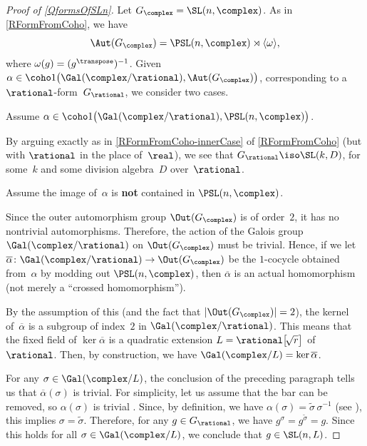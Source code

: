 \begin{proof}[Proof of \cref{QformsOfSLn}]
Let $G_\complex = \SL(n,\complex)$. As in \cref{RFormFromCoho}, we have 
	$$ \Aut (G_{\complex}) = \PSL(n,\complex) \rtimes \langle \omega \rangle ,$$
where $\omega(g) = (g^\transpose)^{-1}$. 
Given $\alpha \in \coho1\bigl( \Gal(\complex/\rational), \Aut(G_{\complex}) \bigr)$, corresponding to a $\rational$-form~$G_\rational$, we consider two cases.

\setcounter{case}{0}

\begin{case} \label{SLQforms-InnerCase}
Assume $\alpha \in \coho1\bigl( \Gal(\complex/\rational), \PSL(n,\complex) \bigr)$. 
\end{case}
By arguing exactly as in \cref{RFormFromCoho-innerCase} of \cref{RFormFromCoho} (but with $\rational$ in the place of~$\real$), we see that $G_\rational \iso \SL(k, D)$, for some~$k$ and some division algebra~$D$ over~$\rational$. 

\begin{case} \label{SLQforms-OuterCase}
Assume the image of~$\alpha$ is \textbf{not} contained in\/ $\PSL(n,\complex)$.
\end{case}
Since the outer automorphism group $\Out ( G_{\complex} )$ is of order~$2$, it has no nontrivial automorphisms. Therefore, the action of the Galois group $\Gal(\complex/\rational)$ on $\Out ( G_{\complex} )$ must be trivial. Hence, if we let $\overline\alpha \colon \Gal(\complex/\rational) \to \Out (G_{\complex} )$ be the  $1$-cocycle obtained from~$\alpha$ by modding out $\PSL(n,\complex)$, then $\overline\alpha$ is an actual homomorphism (not merely a ``crossed homomorphism''). 

By the assumption of this  (and the fact that $| {\Out(G_{\complex})} | = 2$), the kernel of~$\overline\alpha$ is a subgroup of index~$2$ in $\Gal(\complex/\rational)$. This means that the fixed field of $\ker \overline\alpha$ is a quadratic extension $L = \rational \bigl[ \!\sqrt{r}\bigr]$ of~$\rational$. Then, by construction, we have
	$ \Gal ( \complex / L ) = \ker \overline\alpha $.

For any $\sigma \in \Gal(\complex/L)$, the conclusion of the preceding paragraph tells us that $\overline\alpha(\sigma)$ is trivial. For simplicity, let us assume that the bar can be removed, so $\alpha(\sigma)$ is trivial . Since, by definition, we have $ \alpha(\sigma) = \widetilde\sigma \, \sigma^{-1}$ (see ), this implies $\sigma = \widetilde\sigma$. Therefore, for any $g \in G_\rational$, we have
	$ g^\sigma = g^{\widetilde\sigma} = g $.
Since this holds for all $\sigma \in \Gal(\complex/L)$, we conclude that $g \in \SL( n, L)$. 


\end{proof}

